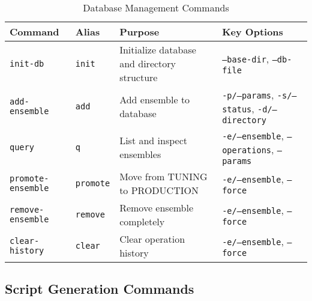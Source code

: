 \documentclass{article}
\begin{document}
\begin{table}[h]
\centering
\begin{tabular}{|l|l|l|l|}
\hline
\textbf{Command} & \textbf{Alias} & \textbf{Purpose} & \textbf{Key Options} \\
\hline
\texttt{init-db} & \texttt{init} & Initialize database and directory structure & \texttt{--base-dir}, \texttt{--db-file} \\
\hline
\texttt{add-ensemble} & \texttt{add} & Add ensemble to database & \texttt{-p/--params}, \texttt{-s/--status}, \texttt{-d/--directory} \\
\hline
\texttt{query} & \texttt{q} & List and inspect ensembles & \texttt{-e/--ensemble}, \texttt{--operations}, \texttt{--params} \\
\hline
\texttt{promote-ensemble} & \texttt{promote} & Move from TUNING to PRODUCTION & \texttt{-e/--ensemble}, \texttt{--force} \\
\hline
\texttt{remove-ensemble} & \texttt{remove} & Remove ensemble completely & \texttt{-e/--ensemble}, \texttt{--force} \\
\hline
\texttt{clear-history} & \texttt{clear} & Clear operation history & \texttt{-e/--ensemble}, \texttt{--force} \\
\hline
\end{tabular}
\caption{Database Management Commands}
\end{table}

\subsection{Script Generation Commands}
\end{document}
